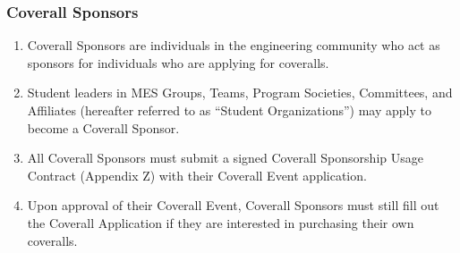 \subsubsection{Coverall Sponsors}
\label{coverall-sponsors}

\begin{enumerate}
 \item
  Coverall Sponsors are individuals in the engineering community who act as sponsors for individuals who are applying for coveralls.
 \item
  Student leaders in MES Groups, Teams, Program Societies, Committees, and Affiliates (hereafter referred to as ``Student Organizations'') may apply to become a Coverall Sponsor.
 \item
  All Coverall Sponsors must submit a signed Coverall Sponsorship Usage Contract (Appendix Z) with their Coverall Event application.
 \item
  Upon approval of their Coverall Event, Coverall Sponsors must still fill out the Coverall Application if they are interested in purchasing their own coveralls.

\end{enumerate}
